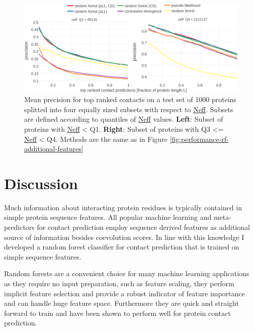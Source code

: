 \documentclass[11pt,a4paper,twoside]{book}
\theoremstyle{definition}
\theoremstyle{definition}
\theoremstyle{remark}
\begin{document}
\begin{figure}
\includegraphics[width=1\linewidth]{img/random_forest_contact_prior/additional_contat_score_features/precision_vs_rank_facetted_by_neff_rf_pll_cd} \caption{Mean precision for
top ranked contacts on a test set of 1000 proteins splitted into four
equally sized subsets with respect to \protect\hyperlink{abbrev}{Neff}.
Subsets are defined according to quantiles of
\protect\hyperlink{abbrev}{Neff} values. \textbf{Left}: Subset of
proteins with \protect\hyperlink{abbrev}{Neff} \textless{} Q1.
\textbf{Right}: Subset of proteins with Q3 \textless{}=
\protect\hyperlink{abbrev}{Neff} \textless{} Q4. Methods are the same as
in Figure \ref{fig:performance-rf-additional-features}}\label{fig:performance-neff-rf-additional-features}
\end{figure}

\section{Discussion}\label{discussion-2}

Much information about interacting protein residues is typically
contained in simple protein sequence features. All popular machine
learning and meta-predictors for contact prediction employ sequence
derived features as additional source of information besides coevolution
scores. In line with this knowledge I developed a random forest
classifier for contact prediction that is trained on simple sequence
features.

Random forests are a convenient choice for many machine learning
applications as they require no input preparation, such as feature
scaling, they perform implicit feature selection and provide a robust
indicator of feature importance and can handle huge feature space.
Furthermore they are quick and straight forward to train and have been
shown to perform well for protein contact prediction.
\end{document}
